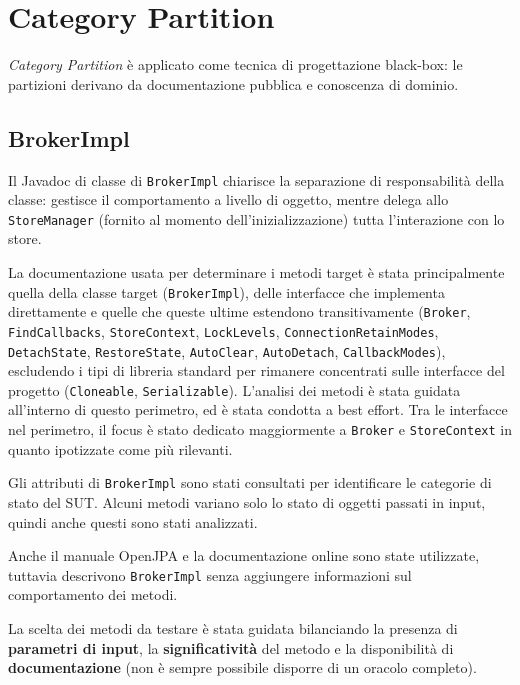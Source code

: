 \section{Category Partition}

\textit{Category Partition} è applicato come tecnica di progettazione
black-box: le partizioni derivano da documentazione pubblica
e conoscenza di dominio.

\subsection{BrokerImpl}

Il Javadoc di classe di \texttt{BrokerImpl} chiarisce la separazione di responsabilità
della classe: gestisce il comportamento a livello di oggetto, mentre delega allo
\texttt{StoreManager} (fornito al momento dell'inizializzazione) tutta l'interazione con
lo store.

La documentazione usata per determinare i metodi target è stata principalmente quella della classe target (\texttt{BrokerImpl}), delle
interfacce che implementa direttamente e quelle che queste ultime estendono
transitivamente (\texttt{Broker}, \texttt{FindCallbacks}, \texttt{StoreContext},
\texttt{LockLevels}, \texttt{ConnectionRetainModes}, \texttt{DetachState},
\texttt{RestoreState}, \texttt{AutoClear}, \texttt{AutoDetach}, \texttt{CallbackModes}),
escludendo i tipi di libreria standard per rimanere concentrati sulle interfacce del progetto (\texttt{Cloneable}, \texttt{Serializable}).
L'analisi dei metodi è stata guidata all'interno di questo perimetro, ed è stata condotta a best effort. Tra le interfacce nel
perimetro, il focus è stato dedicato maggiormente a \texttt{Broker} e \texttt{StoreContext} in quanto
ipotizzate come più rilevanti.

Gli attributi di \texttt{BrokerImpl} sono stati consultati per identificare le categorie di stato del SUT.
Alcuni metodi variano solo lo stato di oggetti passati in input, quindi anche questi sono stati analizzati.

Anche il manuale OpenJPA e la documentazione online sono state utilizzate, tuttavia descrivono \texttt{BrokerImpl}
senza aggiungere informazioni sul comportamento dei metodi.

La scelta dei metodi da testare è stata guidata bilanciando la presenza di \textbf{parametri di input},
la \textbf{significatività} del metodo e la disponibilità di \textbf{documentazione} (non è sempre
possibile disporre di un oracolo completo).


